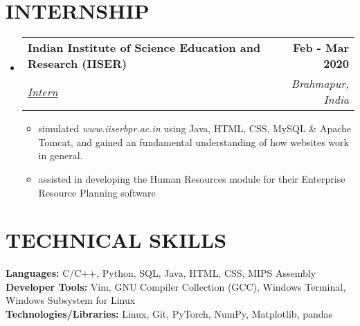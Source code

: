 \documentclass[letterpaper,11pt]{article}
\makeatletter
\newcommand{\resumeItem}[1]{
  \item\small{
    {#1 \vspace{-2pt}}
  }
}
\newcommand{\resumeSubheading}[4]{
  \vspace{-2pt}\item
    \begin{tabular*}{1.0\textwidth}[t]{l@{\extracolsep{\fill}}r}
      \textbf{\large#1} & \textbf{\small #2} \\
      \textit{\large#3} & \textit{\small #4} \\
      
    \end{tabular*}\vspace{-7pt}
}
\newcommand{\resumeSubHeadingListStart}{\begin{itemize}[leftmargin=0.0in, label={}]}
\newcommand{\resumeSubHeadingListEnd}{\end{itemize}}
\newcommand{\resumeItemListStart}{\begin{itemize}}
\newcommand{\resumeItemListEnd}{\end{itemize}\vspace{-5pt}}
\makeatother
\begin{document}
\section{INTERNSHIP}
    \resumeSubHeadingListStart
      \resumeSubheading
        {Indian Institute of Science Education and Research (IISER)}{Feb - Mar 2020}
        {\href{https://drive.google.com/file/d/1MjAsp7TuGCDzTJeRRi4D6GTi0dCwG9xk/view?usp=sharing}{\underline{Intern}} {\raisebox{-0.1\height}\faExternalLink}}{Brahmapur, India}
        \resumeItemListStart
          \resumeItem{\normalsize{simulated \textit{www.iiserbpr.ac.in} using Java, HTML, CSS, MySQL \& Apache Tomcat, and gained an fundamental understanding of how websites work in general.}}
          \resumeItem{\normalsize{assisted in developing the Human Resources module for their Enterprise Resource Planning software}}
        \resumeItemListEnd
    \resumeSubHeadingListEnd
\vspace{-12pt}


\section{TECHNICAL SKILLS}
\begin{itemize}[leftmargin=0.15in, label={}]
	\small{\item{
		\textbf{\normalsize{Languages:}}{ \normalsize{C/C++, Python, SQL, Java, HTML, CSS, MIPS Assembly}} \\
		\textbf{\normalsize{Developer Tools:}}{ \normalsize{Vim, GNU Compiler Collection (GCC), Windows Terminal, Windows Subsystem for Linux}} \\
		\textbf{\normalsize{Technologies/Libraries:}}{\normalsize{ Linux, Git, PyTorch, NumPy, Matplotlib, pandas}} \\
	}}
\end{itemize}
\vspace{-12pt}

 
\end{document}

